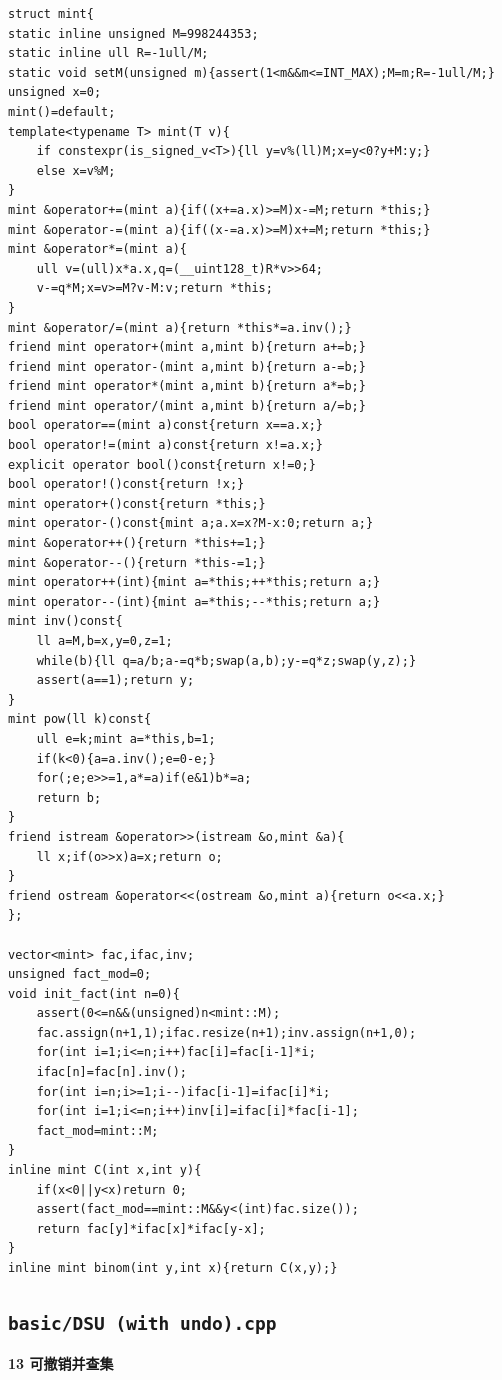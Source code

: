 \documentclass[UTF8,a4paper,10pt]{ctexart}
\begin{document}
\begin{lstlisting}[firstnumber=1]
struct mint{
static inline unsigned M=998244353;
static inline ull R=-1ull/M;
static void setM(unsigned m){assert(1<m&&m<=INT_MAX);M=m;R=-1ull/M;}
unsigned x=0;
mint()=default;
template<typename T> mint(T v){
	if constexpr(is_signed_v<T>){ll y=v%(ll)M;x=y<0?y+M:y;}
	else x=v%M;
}
mint &operator+=(mint a){if((x+=a.x)>=M)x-=M;return *this;}
mint &operator-=(mint a){if((x-=a.x)>=M)x+=M;return *this;}
mint &operator*=(mint a){
	ull v=(ull)x*a.x,q=(__uint128_t)R*v>>64;
	v-=q*M;x=v>=M?v-M:v;return *this;
}
mint &operator/=(mint a){return *this*=a.inv();}
friend mint operator+(mint a,mint b){return a+=b;}
friend mint operator-(mint a,mint b){return a-=b;}
friend mint operator*(mint a,mint b){return a*=b;}
friend mint operator/(mint a,mint b){return a/=b;}
bool operator==(mint a)const{return x==a.x;}
bool operator!=(mint a)const{return x!=a.x;}
explicit operator bool()const{return x!=0;}
bool operator!()const{return !x;}
mint operator+()const{return *this;}
mint operator-()const{mint a;a.x=x?M-x:0;return a;}
mint &operator++(){return *this+=1;}
mint &operator--(){return *this-=1;}
mint operator++(int){mint a=*this;++*this;return a;}
mint operator--(int){mint a=*this;--*this;return a;}
mint inv()const{
	ll a=M,b=x,y=0,z=1;
	while(b){ll q=a/b;a-=q*b;swap(a,b);y-=q*z;swap(y,z);}
	assert(a==1);return y;
}
mint pow(ll k)const{
	ull e=k;mint a=*this,b=1;
	if(k<0){a=a.inv();e=0-e;}
	for(;e;e>>=1,a*=a)if(e&1)b*=a;
	return b;
}
friend istream &operator>>(istream &o,mint &a){
	ll x;if(o>>x)a=x;return o;
}
friend ostream &operator<<(ostream &o,mint a){return o<<a.x;}
};

vector<mint> fac,ifac,inv;
unsigned fact_mod=0;
void init_fact(int n=0){
	assert(0<=n&&(unsigned)n<mint::M);
	fac.assign(n+1,1);ifac.resize(n+1);inv.assign(n+1,0);
	for(int i=1;i<=n;i++)fac[i]=fac[i-1]*i;
	ifac[n]=fac[n].inv();
	for(int i=n;i>=1;i--)ifac[i-1]=ifac[i]*i;
	for(int i=1;i<=n;i++)inv[i]=ifac[i]*fac[i-1];
	fact_mod=mint::M;
}
inline mint C(int x,int y){
	if(x<0||y<x)return 0;
	assert(fact_mod==mint::M&&y<(int)fac.size());
	return fac[y]*ifac[x]*ifac[y-x];
}
inline mint binom(int y,int x){return C(x,y);}
\end{lstlisting}
\par\vspace{1em}
\subsection{\texttt{basic/DSU (with undo).cpp}}
\textbf{13 可撤销并查集}
\end{document}
